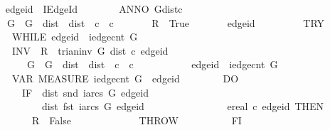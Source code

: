 \begin{isabellebody}
\ \ \isanewline
\ \ \ \ edge{\isacharunderscore}id\ {\isacharcolon}{\isacharcolon}\ IEdge{\isacharunderscore}Id\isanewline
\ \ \ {\isachardoublequoteopen}\isanewline
\ \ \ \ ANNO\ {\isacharparenleft}G{\isacharcomma}dist{\isacharcomma}c{\isacharparenright}{\isachardot}\isanewline
\ \ \ \ \ \ {\isasymlbrace}\ {\isasymacute}G\ {\isacharequal}\ G\ {\isasymand}\ {\isasymacute}dist\ {\isacharequal}\ dist\ {\isasymand}\ {\isasymacute}c\ {\isacharequal}\ c\ {\isasymrbrace}\isanewline
\ \ \ \ \ \ {\isasymacute}R\ {\isacharcolon}{\isacharequal}{\isacharequal}\ True\ {\isacharsemicolon}{\isacharsemicolon}\isanewline
\ \ \ \ \ \ {\isasymacute}edge{\isacharunderscore}id\ {\isacharcolon}{\isacharequal}{\isacharequal}\ {}\ {\isacharsemicolon}{\isacharsemicolon}\isanewline
\ \ \ \ \ \ TRY\isanewline
\ \ \ \ \ \ \ \ WHILE\ {\isasymacute}edge{\isacharunderscore}id\ {\isacharless}\ iedge{\isacharunderscore}cnt\ {\isasymacute}G\isanewline
\ \ \ \ \ \ \ \ INV\ {\isasymlbrace}\ {\isasymacute}R\ {\isacharequal}\ trian{\isacharunderscore}inv\ {\isasymacute}G\ {\isasymacute}dist\ {\isasymacute}c\ {\isasymacute}edge{\isacharunderscore}id\isanewline
\ \ \ \ \ \ \ \ \ \ {\isasymand}\ {\isasymacute}G\ {\isacharequal}\ G\ {\isasymand}\ {\isasymacute}dist\ {\isacharequal}\ dist\ {\isasymand}\ {\isasymacute}c\ {\isacharequal}\ c\isanewline
\ \ \ \ \ \ \ \ \ \ {\isasymand}\ {\isasymacute}edge{\isacharunderscore}id\ {\isasymle}\ iedge{\isacharunderscore}cnt\ {\isasymacute}G{\isasymrbrace}\isanewline
\ \ \ \ \ \ \ \ VAR\ MEASURE\ {\isacharparenleft}iedge{\isacharunderscore}cnt\ {\isasymacute}G\ {\isacharminus}\ {\isasymacute}edge{\isacharunderscore}id{\isacharparenright}\isanewline
\ \ \ \ \ \ \ \ DO\isanewline
\ \ \ \ \ \ \ \ \ \ IF\ \ {\isasymacute}dist\ {\isacharparenleft}snd\ {\isacharparenleft}iarcs\ {\isasymacute}G\ {\isasymacute}edge{\isacharunderscore}id{\isacharparenright}{\isacharparenright}\ {\isachargreater}\ \isanewline
\ \ \ \ \ \ \ \ \ \ \ \ \ \ {\isasymacute}dist\ {\isacharparenleft}fst\ {\isacharparenleft}iarcs\ {\isasymacute}G\ {\isasymacute}edge{\isacharunderscore}id{\isacharparenright}{\isacharparenright}\ {\isacharplus}\ \isanewline
\ \ \ \ \ \ \ \ \ \ \ \ \ \ ereal\ {\isacharparenleft}{\isasymacute}c\ {\isasymacute}edge{\isacharunderscore}id{\isacharparenright}\ THEN\isanewline
\ \ \ \ \ \ \ \ \ \ \ \ {\isasymacute}R\ {\isacharcolon}{\isacharequal}{\isacharequal}\ False\ {\isacharsemicolon}{\isacharsemicolon}\isanewline
\ \ \ \ \ \ \ \ \ \ \ \ THROW\isanewline
\ \ \ \ \ \ \ \ \ \ FI\ {\isacharsemicolon}{\isacharsemicolon}\isanewline

\end{isabellebody}

